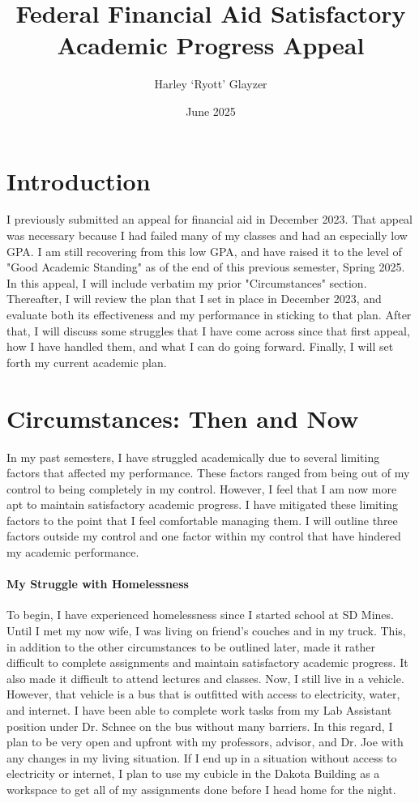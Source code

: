 \documentclass[12pt]{article}
\title{Federal Financial Aid Satisfactory Academic Progress Appeal}
\author{Harley `Ryott' Glayzer}
\date{June 2025}
\begin{document}
\maketitle

\section*{Introduction}
I previously submitted an appeal for financial aid in December 2023.
That appeal was necessary because I had failed many of my classes and had
an especially low GPA\@. 
I am still recovering from this low GPA, and have raised it to the level of
"Good Academic Standing" as of the end of this previous semester, Spring 2025.
In this appeal, I will include verbatim my prior "Circumstances" section.
Thereafter, I will review the plan that I set in place in December 2023,
and evaluate both its effectiveness and my performance in sticking to that plan.
After that, I will discuss some struggles that I have come across since that
first appeal, how I have handled them, and what I can do going forward.
Finally, I will set forth my current academic plan.

\section*{Circumstances: Then and Now}
In my past semesters, I have struggled academically due to several limiting
factors that affected my performance. 
These factors ranged from being out of my control to being completely in my control.
However, I feel that I am now more apt to maintain satisfactory academic progress.
I have mitigated these limiting factors to the point that I feel comfortable managing them.
I will outline three factors outside my control and one factor within my control 
that have hindered my academic performance.

\paragraph{My Struggle with Homelessness}
To begin, I have experienced homelessness since I started school at SD Mines.
Until I met my now wife, I was living on friend's couches and in my truck. 
This, in addition to the other circumstances to be outlined later,
made it rather difficult to complete assignments and maintain satisfactory academic progress.
It also made it difficult to attend lectures and classes.
Now, I still live in a vehicle. 
However, that vehicle is a bus that is outfitted with access to electricity, water, and internet.
I have been able to complete work tasks from my Lab Assistant position under Dr. Schnee 
on the bus without many barriers.
In this regard, I plan to be very open and upfront with my professors, advisor, 
and Dr. Joe with any changes in my living situation.
If I end up in a situation without access to electricity or internet, I plan to use my
cubicle in the Dakota Building as a workspace to get all of my assignments done 
before I head home for the night.
\end{document}
